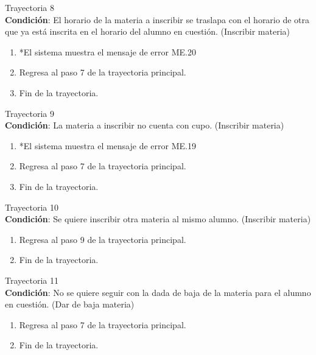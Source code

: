 \large{Trayectoria 8}\\
\textbf{Condición}: El horario de la materia a inscribir se traslapa con el horario de otra que ya está inscrita en el horario del alumno en cuestión. (Inscribir materia)
\begin{enumerate}
    \item *El sistema muestra el mensaje de error ME.20
    \item Regresa al paso 7 de la trayectoria principal.
    \item Fin de la trayectoria.
\end{enumerate}
\large{Trayectoria 9}\\
\textbf{Condición}: La materia a inscribir no cuenta con cupo. (Inscribir materia)
\begin{enumerate}
    \item *El sistema muestra el mensaje de error ME.19
    \item Regresa al paso 7 de la trayectoria principal.
    \item Fin de la trayectoria.
\end{enumerate}
\large{Trayectoria 10}\\
\textbf{Condición}: Se quiere inscribir otra materia al mismo alumno. (Inscribir materia)
\begin{enumerate}
    \item Regresa al paso 9 de la trayectoria principal.
    \item Fin de la trayectoria.
\end{enumerate}
\large{Trayectoria 11}\\
\textbf{Condición}: No se quiere seguir con la dada de baja de la materia para el alumno en cuestión. (Dar de baja materia)
\begin{enumerate}
    \item Regresa al paso 7 de la trayectoria principal.
    \item Fin de la trayectoria.
\end{enumerate}